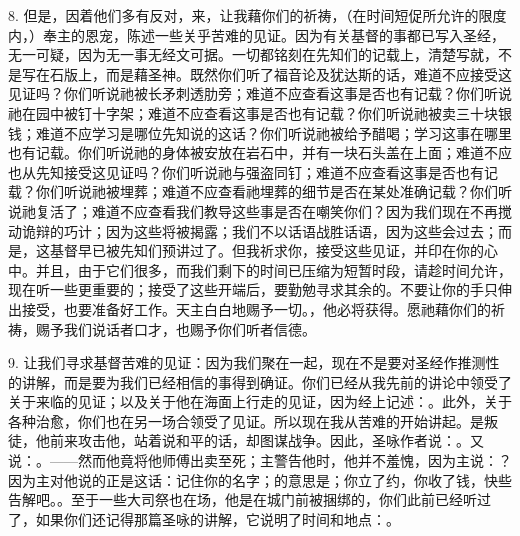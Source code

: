 8. 但是，因着他们多有反对，来，让我藉你们的祈祷，（在时间短促所允许的限度内，）奉主的恩宠，陈述一些关乎苦难的见证。因为有关基督的事都已写入圣经，无一可疑，因为无一事无经文可据。一切都铭刻在先知们的记载上，清楚写就，不是写在石版上，而是藉圣神。既然你们听了福音论及犹达斯的话，难道不应接受这见证吗？你们听说祂被长矛刺透肋旁；难道不应查看这事是否也有记载？你们听说祂在园中被钉十字架；难道不应查看这事是否也有记载？你们听说祂被卖三十块银钱；难道不应学习是哪位先知说的这话？你们听说祂被给予醋喝；学习这事在哪里也有记载。你们听说祂的身体被安放在岩石中，并有一块石头盖在上面；难道不应也从先知接受这见证吗？你们听说祂与强盗同钉；难道不应查看这事是否也有记载？你们听说祂被埋葬；难道不应查看祂埋葬的细节是否在某处准确记载？你们听说祂复活了；难道不应查看我们教导这些事是否在嘲笑你们？因为我们现在不再搅动诡辩的巧计；因为这些将被揭露；我们不以话语战胜话语，因为这些会过去；而是，这基督早已被先知们预讲过了。但我祈求你，接受这些见证，并印在你的心中。并且，由于它们很多，而我们剩下的时间已压缩为短暂时段，请趁时间允许，现在听一些更重要的；接受了这些开端后，要勤勉寻求其余的。不要让你的手只伸出接受，也要准备好工作。天主白白地赐予一切。，他必将获得。愿祂藉你们的祈祷，赐予我们说话者口才，也赐予你们听者信德。\par

9. 让我们寻求基督苦难的见证：因为我们聚在一起，现在不是要对圣经作推测性的讲解，而是要为我们已经相信的事得到确证。你们已经从我先前的讲论中领受了关于来临的见证；以及关于他在海面上行走的见证，因为经上记述：。此外，关于各种治愈，你们也在另一场合领受了见证。所以现在我从苦难的开始讲起。是叛徒，他前来攻击他，站着说和平的话，却图谋战争。因此，圣咏作者说：。又说：。——然而他竟将他师傅出卖至死；主警告他时，他并不羞愧，因为主说：？因为主对他说的正是这话：记住你的名字；的意思是；你立了约，你收了钱，快些告解吧。。至于一些大司祭也在场，他是在城门前被捆绑的，你们此前已经听过了，如果你们还记得那篇圣咏的讲解，它说明了时间和地点：。\par

